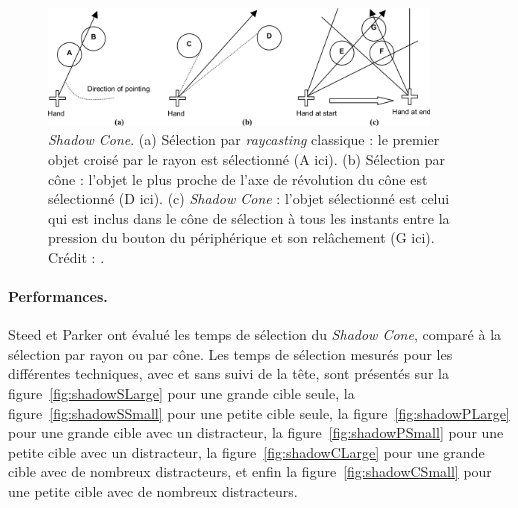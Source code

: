 	\begin{figure}[!htbp]
		\centering
		\includegraphics[width=0.9\textwidth]{figures/ch2/shadow}
		\caption[Fonctionnement du \emph{Shadow Cone}]{\emph{Shadow Cone}. (a) Sélection par \emph{raycasting} classique : le premier objet croisé par le rayon est sélectionné (A ici). (b) Sélection par cône : l'objet le plus proche de l'axe de révolution du cône est sélectionné (D ici). (c) \emph{Shadow Cone} : l'objet sélectionné est celui qui est inclus dans le cône de sélection à tous les instants entre la pression du bouton du périphérique et son relâchement (G ici). Crédit : \cite{steed20043d}.}
		\label{fig:shadow}
	\end{figure}
	
	\paragraph{Performances.}
	Steed et Parker ont évalué les temps de sélection du \emph{Shadow Cone}, comparé à la sélection par rayon ou par cône. Les temps de sélection mesurés pour les différentes techniques, avec et sans suivi de la tête, sont présentés sur la figure~\ref{fig:shadowSLarge} pour une grande cible seule, la figure~\ref{fig:shadowSSmall} pour une petite cible seule, la figure~\ref{fig:shadowPLarge} pour une grande cible avec un distracteur, la figure~\ref{fig:shadowPSmall} pour une petite cible avec un distracteur, la figure~\ref{fig:shadowCLarge} pour une grande cible avec de nombreux distracteurs, et enfin la figure~\ref{fig:shadowCSmall} pour une petite cible avec de nombreux distracteurs.

